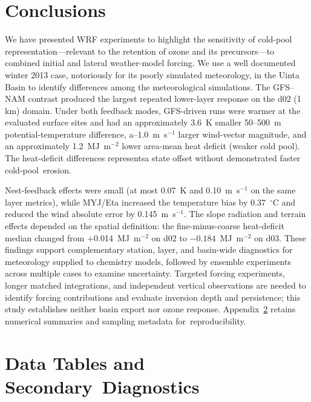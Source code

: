 \documentclass[air,article,accept,moreauthors]{Definitions/mdpi}
\begin{document}
\section{Conclusions}
\label{sec:v3-conclusions}

We have presented WRF experiments to highlight the sensitivity of cold-pool representation---relevant to the retention of ozone and its precursors---to combined initial and lateral weather-model forcing.
We use a well documented winter 2013 case, notoriously for its poorly simulated meteorology, in the Uinta Basin to identify differences among the meteorological simulations.
The GFS--NAM contrast produced the largest repeated lower-layer response on the d02 (1 km) domain.
Under both feedback modes, GFS-driven runs were warmer at the evaluated surface sites and had an approximately 3.6~K smaller 50--500~m potential-temperature difference, a--1.0~m~s$^{-1}$ larger wind-vector magnitude, and an approximately 1.2~MJ~m$^{-2}$ lower area-mean heat deficit (weaker cold pool).
The heat-deficit differences representsa state offset without demonstrated faster cold-pool~erosion.

Nest-feedback effects were small (at most 0.07~K and 0.10~m~s$^{-1}$ on the same layer metrics), while MYJ/Eta increased the temperature bias by 0.37~$^{\circ}$C and reduced the wind absolute error by 0.145~m~s$^{-1}$.
The slope radiation and terrain effects depended on the spatial definition: the fine-minus-coarse heat-deficit median changed from +0.014~MJ~m$^{-2}$ on d02 to $-0.184$~MJ~m$^{-2}$ on d03.
These findings support complementary station, layer, and basin-wide diagnostics for meteorology supplied to chemistry models, followed by ensemble experiments across multiple cases to examine uncertainty.
Targeted forcing experiments, longer matched integrations, and independent vertical observations are needed to identify forcing contributions and evaluate inversion depth and persistence; this study establishes neither basin export nor ozone response.
Appendix~\ref{app:v3-data} retains numerical summaries and sampling metadata for~reproducibility.

\appendixstart
\appendix
\section{Data Tables and Secondary~Diagnostics}
\label{app:v3-data}
\end{document}
